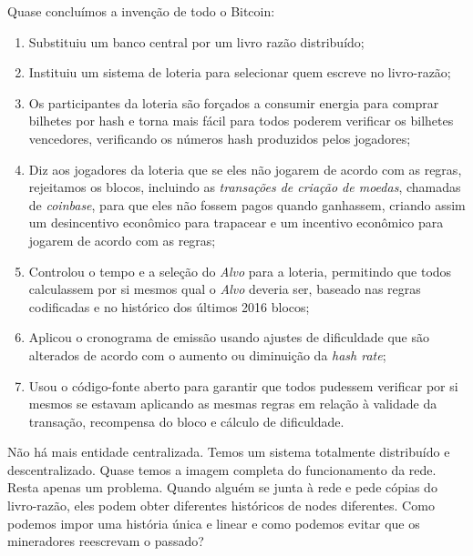 
Quase concluímos a invenção de todo o Bitcoin:

\begin{enumerate}
\item Substituiu um banco central por um livro razão distribuído;
\item Instituiu um sistema de loteria para selecionar quem escreve no livro-razão;
\item Os participantes da loteria são forçados a consumir energia para comprar bilhetes por hash e torna mais fácil para todos poderem verificar os bilhetes vencedores, verificando os números hash produzidos pelos jogadores;
\item Diz aos jogadores da loteria que se eles não jogarem de acordo com as regras, rejeitamos os blocos, incluindo as \textit{transações de criação de moedas}, chamadas de \textit{coinbase}, para que eles não fossem pagos quando ganhassem, criando assim um desincentivo econômico para trapacear e um incentivo econômico para jogarem de acordo com as regras;
\item Controlou o tempo e a seleção do \textit{Alvo} para a loteria, permitindo que todos calculassem por si mesmos qual o \textit{Alvo} deveria ser, baseado nas regras codificadas e no histórico dos últimos 2016 blocos;
\item Aplicou o cronograma de emissão usando ajustes de dificuldade que são alterados de acordo com o aumento ou diminuição da \textit{hash rate};
\item Usou o código-fonte aberto para garantir que todos pudessem verificar por si mesmos se estavam aplicando as mesmas regras em relação à validade da transação, recompensa do bloco e cálculo de dificuldade.
\end{enumerate}

 
Não há mais entidade centralizada. Temos um sistema totalmente distribuído e descentralizado.
Quase temos a imagem completa do funcionamento da rede. Resta apenas um problema. Quando alguém se junta à rede e pede cópias do livro-razão, eles podem obter diferentes históricos de nodes diferentes. Como podemos impor uma história única e linear e como podemos evitar que os mineradores reescrevam o passado?